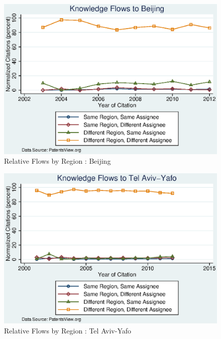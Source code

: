 \documentclass[12pt]{article}
\begin{document}
\begin{figure}[h]
\begin{centering}
  \includegraphics[width=\textwidth]{BeijingNormalized}
  \caption{Relative Flows by Region : Beijing}
  \label{fig:BeijingNormalized}
\end{centering}
\end{figure}

\begin{figure}[h]
\begin{centering}
  \includegraphics[width=\textwidth]{TelAviv-YafoNormalized}
  \caption{Relative Flows by Region : Tel Aviv-Yafo}
  \label{fig:TelAviv-YafoNormalized}
\end{centering}
\end{figure}
\end{document}
